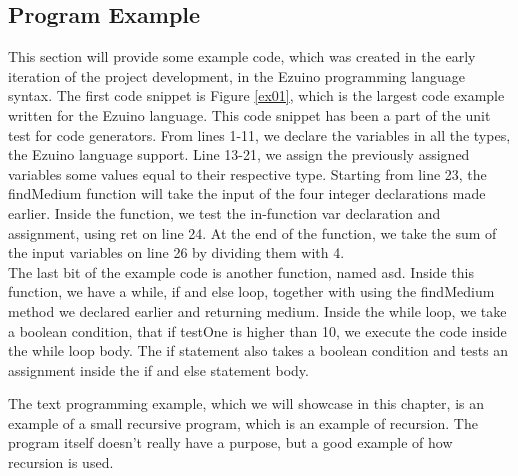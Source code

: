 \subsection{Program Example}
This section will provide some example code, which was created in the early iteration of the project development, in the Ezuino programming language syntax. The first code snippet is Figure \ref{ex01}, which is the largest code example written for the Ezuino language. This code snippet has been a part of the unit test for code generators. From lines 1-11, we declare the variables in all the types, the Ezuino language support. Line 13-21, we assign the previously assigned variables some values equal to their respective type. Starting from line 23, the findMedium function will take the input of the four integer declarations made earlier. Inside the function, we test the in-function var declaration and assignment, using ret on line 24. At the end of the function, we take the sum of the input variables on line 26 by dividing them with 4. \\
The last bit of the example code is another function, named asd. Inside this function, we have a while, if and else loop, together with using the findMedium method we declared earlier and returning medium. Inside the while loop, we take a boolean condition, that if testOne is higher than 10, we execute the code inside the while loop body. The if statement also takes a boolean condition and tests an assignment inside the if and else statement body.

\noindent\newline
The text programming example, which we will showcase in this chapter, is an example of a small recursive program, which is an example of recursion. The program itself doesn’t really have a purpose, but a good example of how recursion is used.

\noindent\newline
